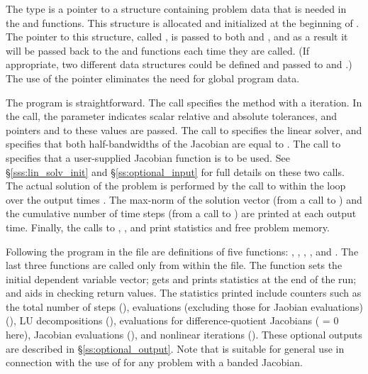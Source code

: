 The type  is a pointer to a structure containing
problem data that is needed in the  and  functions.
This structure is allocated and initialized at the beginning
of . The pointer to this structure, called ,
is passed to both  and ,
and as a result it will be passed back to the  and 
functions each time they are called.  (If appropriate, two different
data structures could be defined and passed to  and .)
The use of the  pointer eliminates the need for global
program data.

The  program is straightforward.  The  call
specifies the  method with a  iteration. In the
 call, the parameter  indicates scalar relative
and absolute tolerances, and pointers  and  to
these values are passed.  The call to  specifies the {\cvband}
linear solver, and specifies that both half-bandwidths of the Jacobian
are equal to .  The call to  specifies
that a user-supplied Jacobian function  is to be used.
See \S\ref{sss:lin_solv_init} and \S\ref{ss:optional_input} for full details
on these two calls.  The actual solution of the problem is performed by
the call to  within the loop over the output times .
The max-norm of the solution vector (from a call to ) and
the cumulative number of time steps (from a call to ) are
printed at each output time. Finally, the calls to ,
, and  print statistics and free problem memory.

Following the  program in the  file are definitions of
five functions: , , , , and
.   The last three functions are called only from within the
 file.  The  function sets the initial dependent variable
vector;  gets and prints statistics at the end of the run;
and  aids in checking return values.  The statistics
printed include counters such as the total number of steps (), 
 evaluations (excluding those for Jaobian evaluations) (),
LU decompositions (),  evaluations for
difference-quotient Jacobians ( = 0 here),
Jacobian evaluations (), and nonlinear iterations ().
These optional outputs are described in \S\ref{ss:optional_output}.
Note that  is suitable for general use in connection
with the use of {\cvode} for any problem with a banded Jacobian.

